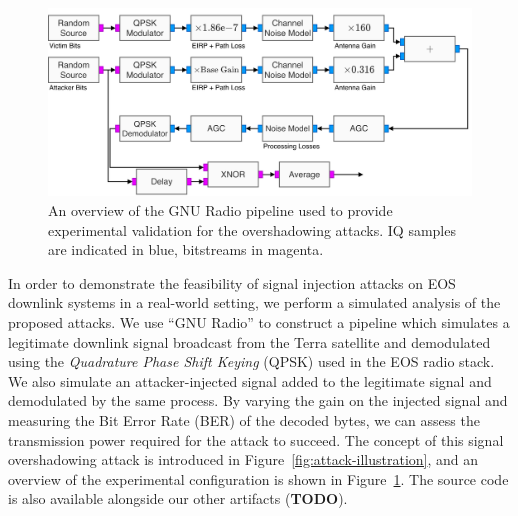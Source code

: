\begin{figure}
    \centering
    \includegraphics[width=\columnwidth]{diagrams/overshadowing_pipeline.pdf}
    \caption{An overview of the GNU Radio pipeline used to provide experimental validation for the overshadowing attacks. IQ samples are indicated in blue, bitstreams in magenta.}
    \label{fig:overshadowing_pipeline}
\end{figure}

In order to demonstrate the feasibility of signal injection attacks on EOS downlink systems in a real-world setting, we perform a simulated analysis of the proposed attacks.
We use ``GNU Radio'' to construct a pipeline which simulates a legitimate downlink signal broadcast from the Terra satellite and demodulated using the \textit{Quadrature Phase Shift Keying} (QPSK) used in the EOS radio stack.
We also simulate an attacker-injected signal added to the legitimate signal and demodulated by the same process.
By varying the gain on the injected signal and measuring the Bit Error Rate (BER) of the decoded bytes, we can assess the transmission power required for the attack to succeed.
The concept of this signal overshadowing attack is introduced in Figure~\ref{fig:attack-illustration}, and an overview of the experimental configuration is shown in Figure~\ref{fig:overshadowing_pipeline}.
The source code is also available alongside our other artifacts (\textbf{TODO}).

